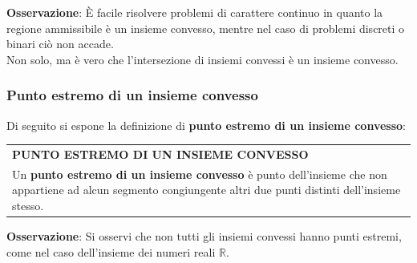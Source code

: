 \documentclass[a4paper]{extarticle}
\renewcommand\arraystretch{}
\begin{document}
\vspace{1em}
\noindent
\textbf{Osservazione}: È facile risolvere problemi di carattere continuo in quanto la regione ammissibile è un insieme convesso, mentre nel caso di problemi discreti o binari ciò non accade.\\
Non solo, ma è vero che l'intersezione di insiemi convessi è un insieme convesso.

\vspace{1em}
\noindent
\subsubsection{Punto estremo di un insieme convesso}
Di seguito si espone la definizione di \textbf{punto estremo di un insieme convesso}:

\vspace{1em}
\setlength{\tabcolsep}{14pt}
\renewcommand{\arraystretch}{2}
\noindent
\begin{tabularx}{\textwidth}{@{}|P|@{}}
    \hline
    {\textbf{PUNTO ESTREMO DI UN INSIEME CONVESSO}}\\
    \parbox{\linewidth}{Un \textbf{punto estremo di un insieme convesso} è punto dell'insieme che non appartiene ad alcun segmento congiungente altri due punti distinti dell'insieme stesso.\vspace{3mm}}\\
    \hline
\end{tabularx}

\vspace{1em}
\noindent
\textbf{Osservazione}: Si osservi che non tutti gli insiemi convessi hanno punti estremi, come nel caso dell'insieme dei numeri reali $\mathbb{R}$.

\vspace{1em}
\noindent
\end{document}
